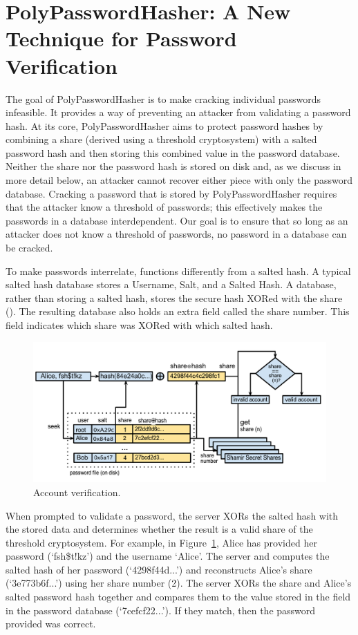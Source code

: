 \section{PolyPasswordHasher: A New Technique for Password Verification}
\label{SEC:design}


The goal of PolyPasswordHasher is to make cracking individual passwords
infeasible.  It provides a way of preventing an attacker from validating a
password hash.  At its core, PolyPasswordHasher aims to protect password hashes
by combining a share (derived using a threshold cryptosystem) with a salted
password hash and then storing this combined value in the password database.
Neither the share nor the password hash is stored on disk and, as we discuss in
more detail below, an attacker cannot recover either piece with only the
password database.  Cracking a password that is stored by PolyPasswordHasher
requires that the attacker know a threshold of passwords; this effectively
makes the passwords in a database interdependent.  Our goal is to ensure that
so long as an attacker does not know a threshold of passwords, no password in a
database can be cracked.

To make passwords interrelate, \PPH functions differently from a salted hash.  A
typical salted hash database stores a Username, Salt, and a Salted Hash.  A \PPH
database, rather than storing a salted hash, stores the secure hash XORed with
the share (\sxh).  The resulting \PPH database also holds an extra field called the
share number.  This field indicates which share was XORed with which salted
hash.   

\begin{figure}
    \includegraphics[width=1\linewidth]{./images/Verify_account.pdf}
    \caption{Account verification. }
    \label{FIGURE:account-verification}
\end{figure}


When prompted to validate a password, the server XORs the salted hash with the
stored data and determines whether the result is a valid share of the threshold
cryptosystem.  For example, in Figure~\ref{FIGURE:account-verification}, Alice
has provided her password (`fsh\$t!kz') and the username `Alice'.  
The server and computes the salted hash of her password (`4298f44d...') and
reconstructs Alice's share (`3e773b6f...') using her share number
(2).  The server XORs the share and Alice's salted password hash together
and compares them to the value stored in the \sxh field in the password
database (`7cefcf22...').  If they match, then the password
provided was correct.

